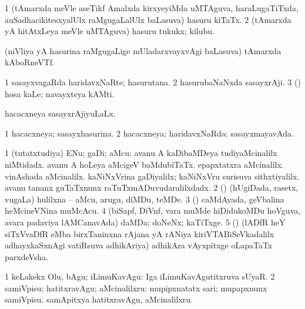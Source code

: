 \bentry
{} 
\gl{\nA}
\expl{}
\bmng
\bnum
\num{1} (tAmarxda meVle aseTikf Amalxda kirxyeyiMda uMTAguva, haraLugaTiTxda, auSadhacikitesxyalUlx raMgugaLalUlx baLasuva) hasuru kiTaTx. 
\num{2} (tAmarxda yA hitAtxLeya meVle uMTAguva) hasuru tukukx; kilubu. 
\enum
\emng
\eentry

\bentry
{} 
\gl{\nA}
\expl{}
\bmng
 (niVliya yA hasurina raMgugaLige mUladarxvayxvAgi baLasuva) tAmarxda kAboRneVTf. 
\emng
\eentry

\bentry
{} 
\gl{\nA}
\expl{}
\bmng
\bnum
\num{1} sasayxvagaRda haridavxNaRte; hasurutana. 
\num{2} hasurubaNaNxda sasayxrAji. 
\num{3} (\kAparx) hosa kaLe; navayxteya kAMti. 
\enum
\emng
\eentry

\bentry
{} 
\gl{\gu}
\expl{}
\bmng
 hacacxneya sasayxrAjiyuLaLx. 
\emng
\eentry

\bentry
{} 
\gl{\gu}
\expl{}
\bmng
\bnum
\num{1} hacacxneya; sasayxhasurina. 
\num{2} hacacxneya; haridavxNaRda; sasayxmayavAda. 
\enum
\emng
\eentry

\bentry
{} 
\gl{\nA}
\expl{}
\bmng
\bnum
\num{1} (tutatxtudiya) ENu; gaDi; aMcu:  avanu A kaDibaMDeya tudiyaMcinalilx niMtidadx.  avanu A hoLeya aMcigeV baMdubiTaTx.  epapxtatxra aMcinalilx.  vinAshada aMcinalilx.  kaNiNxVrina gaDiyalilx; kaNiNxVru surisuva sithxtiyalilx.  avanu tananx guTaTxnunx raTuTxmADuvudaralilxdadx. 
\num{2} (\birx) (hUgiDada, rasetx, \mo vugaLa) hulilxna -- aMcu, arugu, diMDu, teMDe. 
\num{3} (\vAshi) caMdAyada, geVbalina heMcineVNina muMcAcu. 
\num{4} (biSapf, DiVnf, \mo vara muMde hiDidukoMDu hoVguva, avara padaviya lAMCanavAda) daMDa; doNeNx; kaTiTxge. 
\num{5} (\ca) (lADfR heY siTxVvaDfR eMba birxTaninxna rAjana yA rANiya kiriVTABiSeVkadalilx adhayxkaSxnAgi vatiRsuva adhikAriya) adhikAra vAyxpitxge oLapaTaTx parxdeVsha. 
\enum
\emng
\eentry

\bentry
{} 
\gl{\akirx}
\expl{}
\bmng
\bnum
\num{1} keLakekx Olu, bAgu; iLimuKavAgu:  Iga iLimuKavAgutitxruva sUyaR. 
\num{2} samiVpisu; hatitxravAgu; aMcinalilxru:  mupipxnatatx sari; mupapxnunx samiVpisu.  samApitxya hatitxravAgu, aMcinalilxru. 
\enum
\emng

